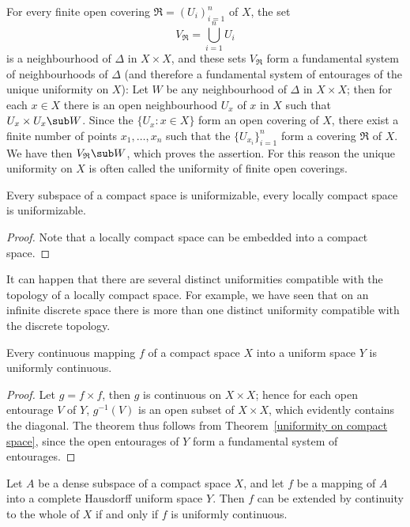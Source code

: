 \begin{remark}
For every finite open covering $\mathfrak{R}=(U_i)_{i=1}^{n}$ of $X$, the set
\[V_{\mathfrak{R}}=\bigcup_{i=1}^{n}U_i\]
is a neighbourhood of $\Delta$ in $X\times X$, and these sets $V_{\mathfrak{R}}$ form a fundamental system of neighbourhoods of $\Delta$ (and therefore a fundamental system of entourages of the unique uniformity on $X$): Let $W$ be any neighbourhood of $\Delta$ in $X\times X$; then for each $x\in X$ there is an open neighbourhood $U_x$ of $x$ in $X$ such that $U_x\times U_x\sub W$. Since the $\{U_x:x\in X\}$ form an open covering of $X$, there exist a finite number of points $x_1,\dots,x_n$ such that the $\{U_{x_i}\}_{i=1}^{n}$ form a covering $\mathfrak{R}$ of $X$. We have then $V_{\mathfrak{R}}\sub W$, which proves the assertion. For this reason the unique uniformity on $X$ is often called the uniformity of finite open coverings.
\end{remark}
\begin{corollary}
Every subspace of a compact space is uniformizable, every locally compact space is uniformizable.
\end{corollary}
\begin{proof}
Note that a locally compact space can be embedded into a compact space.
\end{proof}
It can happen that there are several distinct uniformities compatible with the topology of a locally compact space. For example, we have seen that on an infinite discrete space there is more than one distinct uniformity compatible with the discrete topology.
\begin{theorem}
Every continuous mapping $f$ of a compact space $X$ into a uniform space $Y$ is uniformly continuous.
\end{theorem}
\begin{proof}
Let $g=f\times f$, then $g$ is continuous on $X\times X$; hence for each open entourage $V$ of $Y$, $g^{-1}(V)$ is an open subset of $X\times X$, which evidently contains the diagonal. The theorem thus follows from Theorem~\ref{uniformity on compact space}, since the open entourages of $Y$ form a fundamental system of entourages.
\end{proof}
\begin{corollary}
Let $A$ be a dense subspace of a compact space $X$, and let $f$ be a mapping of $A$ into a complete Hausdorff uniform space $Y$. Then $f$ can  be extended by continuity to the whole of $X$ if and only if $f$ is uniformly continuous.
\end{corollary}
